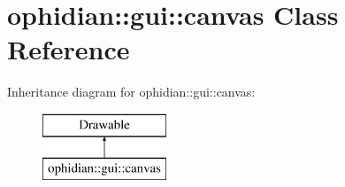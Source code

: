\hypertarget{classophidian_1_1gui_1_1canvas}{\section{ophidian\-:\-:gui\-:\-:canvas Class Reference}
\label{classophidian_1_1gui_1_1canvas}
}
Inheritance diagram for ophidian\-:\-:gui\-:\-:canvas\-:\begin{figure}[H]
\begin{center}
\leavevmode
\includegraphics[height=2.000000cm]{classophidian_1_1gui_1_1canvas}
\end{center}
\end{figure}
